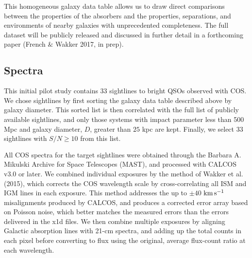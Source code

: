 \documentclass[twocolumn,tighten]{aastex6}
\begin{document}
This homogeneous galaxy data table allows us to draw direct comparisons between the properties of the absorbers and the properties, separations, and environments of nearby galaxies with unprecedented completeness. The full dataset will be publicly released and discussed in further detail in a forthcoming paper (French $\&$ Wakker 2017, in prep).


\subsection{Spectra}

This initial pilot study contains 33 sightlines to bright QSOs observed with COS. We chose sightlines by first sorting the galaxy data table described above by galaxy diameter. This sorted list is then correlated with the full list of publicly available sightlines, and only those systems with impact parameter less than 500 Mpc and galaxy diameter, $D$, greater than $25$ kpc  are kept. Finally, we select 33 sightlines with $S/N \geq 10$ from this list.

All COS spectra for the target sightlines were obtained through the Barbara A. Mikulski Archive for Space Telescopes (MAST), and processed with CALCOS v3.0 or later. We combined individual exposures by the method of Wakker et al. (2015), which corrects the COS wavelength scale by cross-correlating all ISM and IGM lines in each exposure. This method addresses the up to $\pm40$ $\rm km\, s^{-1}$ misalignments produced by CALCOS, and produces a corrected error array based on Poisson noise, which better matches the measured errors than the errors delivered in the x1d files. We then combine multiple exposures by aligning Galactic absorption lines with 21-cm spectra, and adding up the total counts in each pixel before converting to flux using the original, average flux-count ratio at each wavelength.
\end{document}
